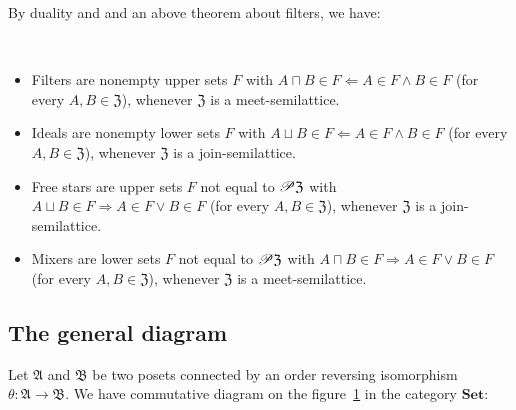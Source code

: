 By duality and and an above theorem about filters, we have:
\begin{prop}
~
\begin{itemize}
\item Filters are nonempty upper sets $F$ with $A\sqcap B\in F\Leftarrow A\in F\land B\in F$
(for every $A,B\in\mathfrak{Z}$), whenever $\mathfrak{Z}$ is a meet-semilattice.
\item Ideals are nonempty lower sets $F$ with $A\sqcup B\in F\Leftarrow A\in F\land B\in F$
(for every $A,B\in\mathfrak{Z}$), whenever $\mathfrak{Z}$ is a join-semilattice.
\item Free stars are upper sets $F$ not equal to $\mathscr{P}\mathfrak{Z}$
with $A\sqcup B\in F\Rightarrow A\in F\lor B\in F$ (for every $A,B\in\mathfrak{Z}$),
whenever $\mathfrak{Z}$ is a join-semilattice.
\item Mixers are lower sets $F$ not equal to $\mathscr{P}\mathfrak{Z}$ with
$A\sqcap B\in F\Rightarrow A\in F\lor B\in F$ (for every $A,B\in\mathfrak{Z}$),
whenever $\mathfrak{Z}$ is a meet-semilattice.
\end{itemize}
\end{prop}

\subsection{The general diagram}

Let $\mathfrak{A}$ and $\mathfrak{B}$ be two posets connected by
an order reversing isomorphism $\theta:\mathfrak{A}\rightarrow\mathfrak{B}$.
We have commutative diagram on the figure~\ref{theta-sets} in the
category $\mathbf{Set}$:

\begin{figure}[ht]
\caption{\label{theta-sets}}


\end{figure}

